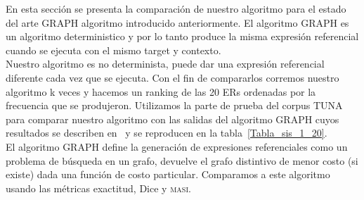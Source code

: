 
En esta secci\'on se presenta la comparaci\'on de nuestro algoritmo para el estado del arte GRAPH algoritmo introducido anteriormente. El algoritmo GRAPH es un algoritmo deterministico y por lo tanto produce la misma expresi\'on referencial cuando se ejecuta con el mismo target y contexto. \\

Nuestro algoritmo es no determinista, puede dar una expresi\'on referencial diferente cada vez que se ejecuta. Con el fin de compararlos corremos nuestro algoritmo k veces y hacemos un ranking de las 20 ERs ordenadas por la frecuencia que se produjeron. Utilizamos la parte de prueba del corpus TUNA para comparar nuestro algoritmo con las salidas del algoritmo GRAPH cuyos resultados se describen en~\cite{KrahmerGRAPH} y se reproducen en la tabla~\ref{Tabla_sis_1_20}.\\

El algoritmo GRAPH define la generaci\'on de expresiones referenciales como un problema de b\'usqueda en un grafo, devuelve el grafo distintivo de menor costo (si existe) dada una funci\'on de costo particular. Comparamos a este algoritmo usando las m\'etricas exactitud, Dice y \textsc {masi}. 




%
%
%
%
%
%
%
%
%
%
%
%
%

